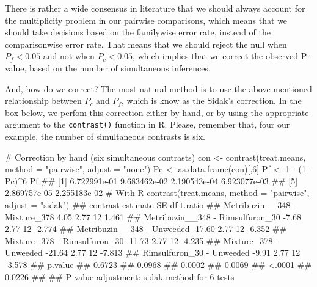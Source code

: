 \documentclass[a4paper,12pt,oneside]{book}
\newenvironment{Shaded}{\begin{snugshade}}{\end{snugshade}}
\newcommand{\DecValTok}[1]{#1}
\newcommand{\SpecialCharTok}[1]{#1}
\newcommand{\StringTok}[1]{#1}
\newcommand{\CommentTok}[1]{#1}
\newcommand{\DocumentationTok}[1]{#1}
\newcommand{\OtherTok}[1]{#1}
\newcommand{\FunctionTok}[1]{#1}
\newcommand{\AttributeTok}[1]{#1}
\newcommand{\NormalTok}[1]{#1}
\begin{document}
There is rather a wide consensus in literature that we should always account for the multiplicity problem in our pairwise comparisons, which means that we should take decisions based on the familywise error rate, instead of the comparisonwise error rate. That means that we should reject the null when \(P_f < 0.05\) and not when \(P_c < 0.05\), which implies that we correct the observed P-value, based on the number of simultaneous inferences.

And, how do we correct? The most natural method is to use the above mentioned relationship between \(P_c\) and \(P_f\), which is know as the Sidak's correction. In the box below, we perfom this correction either by hand, or by using the appropriate argument to the \texttt{contrast()} function in R. Please, remember that, four our example, the number of simultaneous contrasts is six.

\scriptsize

\begin{Shaded}
\begin{Highlighting}[]
\CommentTok{\# Correction by hand (six simultaneous contrasts)}
\NormalTok{con }\OtherTok{\textless{}{-}} \FunctionTok{contrast}\NormalTok{(treat.means, }\AttributeTok{method =} \StringTok{"pairwise"}\NormalTok{, }\AttributeTok{adjust =} \StringTok{"none"}\NormalTok{)}
\NormalTok{Pc }\OtherTok{\textless{}{-}} \FunctionTok{as.data.frame}\NormalTok{(con)[,}\DecValTok{6}\NormalTok{]}
\NormalTok{Pf }\OtherTok{\textless{}{-}} \DecValTok{1} \SpecialCharTok{{-}}\NormalTok{ (}\DecValTok{1} \SpecialCharTok{{-}}\NormalTok{ Pc)}\SpecialCharTok{\^{}}\DecValTok{6}
\NormalTok{Pf}
\DocumentationTok{\#\# [1] 6.722991e{-}01 9.683462e{-}02 2.190543e{-}04 6.923077e{-}03}
\DocumentationTok{\#\# [5] 2.869757e{-}05 2.255183e{-}02}
\CommentTok{\# With R}
\FunctionTok{contrast}\NormalTok{(treat.means, }\AttributeTok{method =} \StringTok{"pairwise"}\NormalTok{, }\AttributeTok{adjust =} \StringTok{"sidak"}\NormalTok{)}
\DocumentationTok{\#\#  contrast                         estimate   SE df t.ratio}
\DocumentationTok{\#\#  Metribuzin\_\_348 {-} Mixture\_378        4.05 2.77 12  1.461 }
\DocumentationTok{\#\#  Metribuzin\_\_348 {-} Rimsulfuron\_30    {-}7.68 2.77 12 {-}2.774 }
\DocumentationTok{\#\#  Metribuzin\_\_348 {-} Unweeded         {-}17.60 2.77 12 {-}6.352 }
\DocumentationTok{\#\#  Mixture\_378 {-} Rimsulfuron\_30       {-}11.73 2.77 12 {-}4.235 }
\DocumentationTok{\#\#  Mixture\_378 {-} Unweeded             {-}21.64 2.77 12 {-}7.813 }
\DocumentationTok{\#\#  Rimsulfuron\_30 {-} Unweeded           {-}9.91 2.77 12 {-}3.578 }
\DocumentationTok{\#\#  p.value}
\DocumentationTok{\#\#  0.6723 }
\DocumentationTok{\#\#  0.0968 }
\DocumentationTok{\#\#  0.0002 }
\DocumentationTok{\#\#  0.0069 }
\DocumentationTok{\#\#  \textless{}.0001 }
\DocumentationTok{\#\#  0.0226 }
\DocumentationTok{\#\# }
\DocumentationTok{\#\# P value adjustment: sidak method for 6 tests}
\end{Highlighting}
\end{Shaded}
\end{document}
